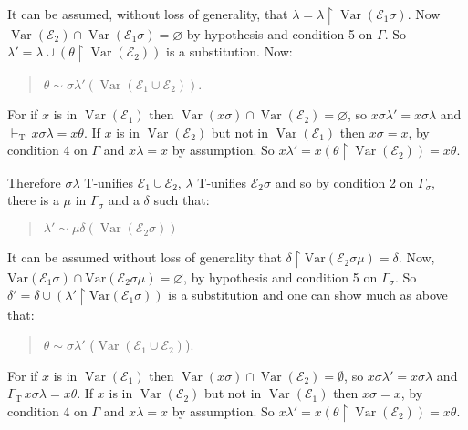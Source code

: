 \documentclass[letterpaper]{report}
\begin{document}
It can be assumed, without loss of generality, that
$\lambda = \lambda \upharpoonright \operatorname{Var}(\mathcal{E}_{1}\sigma)$. Now
$\operatorname{Var}(\mathcal{E}_{2})\cap\operatorname{Var}(\mathcal{E}_{1} \sigma) = \varnothing$
by hypothesis and condition 5 on $\Gamma$. So
$\lambda' = \lambda\cup(\theta \upharpoonright \operatorname{Var}(\mathcal{E}_{2}))$
is a substitution. Now:
\begin{quote}
$\theta \sim \sigma\lambda' (\operatorname{Var}(\mathcal{E}_{1}\cup\mathcal{E}_{2}))$.
\end{quote}

For if $x$ is in $\operatorname{Var}(\mathcal{E}_{1})$ then
$\operatorname{Var}(x\sigma)\cap\operatorname{Var}(\mathcal{E}_{2}) = \varnothing$,
so $x\sigma\lambda' = x\sigma\lambda$ and
$\vdash_{\operatorname{T}}\,x\sigma\lambda = x\theta$. If $x$ is in
$\operatorname{Var}(\mathcal{E}_{2})$ but not in
$\operatorname{Var}(\mathcal{E}_{1})$ then $x\sigma = x$, by
condition 4 on $\Gamma$ and $x\lambda = x$ by assumption. So
$x\lambda' = x(\theta \upharpoonright \operatorname{Var}(\mathcal{E}_{2})) = x\theta$.

Therefore $\sigma\lambda$ $\mathrm{T}$-unifies
$\mathcal{E}_{1}\cup\mathcal{E}_{2}$, $\lambda$
$\mathrm{T}$-unifies $\mathcal{E}_{2}\sigma$ and so by condition 2
on $\Gamma_{\sigma}$, there is a $\mu$ in $\Gamma_{\sigma}$ and a
$\delta$ such that:
\begin{quote}
$\lambda' \sim \mu\delta (\operatorname{Var}(\mathcal{E}_{2}\sigma))$
\end{quote}

It can be assumed without loss of generality that
$\delta\upharpoonright\mathrm{Var}(\mathcal{E}_{2}\sigma\mu)=\delta$.
Now,
$\mathrm{Var}(\mathcal{E}_{1}\sigma)\cap\mathrm{Var}(\mathcal{E}_{2}\sigma\mu) =\varnothing$,
by hypothesis and condition 5 on $\Gamma_{\sigma}$. So
$\delta'=\delta\cup(\lambda'\upharpoonright\mathrm{Var}( \mathcal{E}_{1}\sigma))$
is a substitution and one can show much as above that:
\begin{quote}
$\theta\sim\sigma\lambda'$ ($\operatorname{Var}(\mathcal{E}_{1}\cup\mathcal{E}_{2})$).
\end{quote}


For if $x$ is in $\operatorname{Var}(\mathcal{E}_{1})$ then $\operatorname{Var}(x\sigma)\cap\operatorname{Var}(\mathcal{E}_{2})=\emptyset$, so $x\sigma\lambda'=x\sigma\lambda$ and $\Gamma_{\operatorname{T}}\,x\sigma\lambda=x\theta$. If $x$ is in $\operatorname{Var}(\mathcal{E}_{2})$ but not in $\operatorname{Var}(\mathcal{E}_{1})$ then $x\sigma=x$, by condition 4 on $\Gamma$ and $x\lambda=x$ by assumption. So $x\lambda'=x(\theta \upharpoonright \operatorname{Var}(\mathcal{E}_{2}))=x\theta$.
\end{document}
